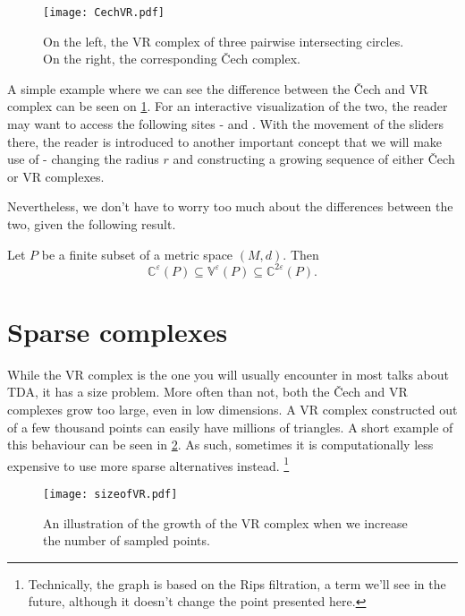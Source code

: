 \begin{figure}[h!]
  \centering
  \texttt{[image: CechVR.pdf]}
  \caption{On the left, the VR complex of three pairwise intersecting circles. On the right, the corresponding Čech complex.}
  \label{fig:CechVR}
\end{figure}

\noindent
A simple example where we can see the difference between the Čech and VR complex can be seen on \ref{fig:CechVR}. For an interactive visualization of the two, the reader may want to access the following sites - \cite{smajhiVietorisx2013RipsComplex} and \cite{saulnechComplex}. With the movement of the sliders there, the reader is introduced to another important concept that we will make use of - changing the radius $r$ and constructing a growing sequence of either Čech or VR complexes.

Nevertheless, we don't have to worry too much about the differences between the two, given the following result.

\begin{theorem}
  Let $P$ be a finite subset of a metric space $(M,d)$. Then
  \begin{equation}
    \mathbb{C}^{\varepsilon}(P) \subseteq \mathbb{V}^{\varepsilon}(P) \subseteq \mathbb{C}^{2\varepsilon}(P).
  \end{equation}
\end{theorem}

\section{Sparse complexes}

While the VR complex is the one you will usually encounter in most talks about TDA, it has a size problem. More often than not, both the Čech and VR complexes grow too large, even in low dimensions. A VR complex constructed out of a few thousand points can easily have millions of triangles. A short example of this behaviour can be seen in \ref{fig:sizeofVR}. As such, sometimes it is computationally less expensive to use more sparse alternatives instead. \footnote{Technically, the graph is based on the Rips filtration, a term we'll see in the future, although it doesn't change the point presented here.}

\begin{figure}[h!]
  \centering
  \texttt{[image: sizeofVR.pdf]}
  \caption{An illustration of the growth of the VR complex when we increase the number of sampled points.}
  \label{fig:sizeofVR}
\end{figure}

